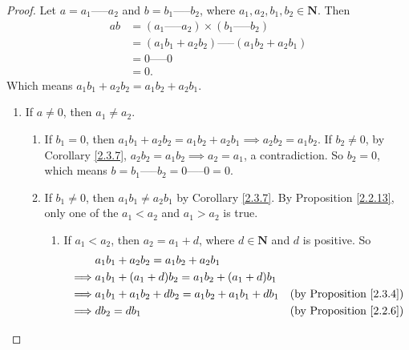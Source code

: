 \begin{proof}
    Let \(a = a_1 \text{-----} a_2\) and \(b = b_1 \text{-----} b_2\), where \(a_1, a_2, b_1, b_2 \in \mathbf{N}\).
    Then
    \begin{align*}
        ab & = (a_1 \text{-----} a_2) \times (b_1 \text{-----} b_2) \\
           & = (a_1b_1 + a_2b_2) \text{-----} (a_1b_2 + a_2b_1)     \\
           & = 0 \text{-----} 0                                     \\
           & = 0.
    \end{align*}
    Which means \(a_1b_1 + a_2b_2 = a_1b_2 + a_2b_1\).
    \begin{enumerate}
        \item If \(a \neq 0\), then \(a_1 \neq a_2\).
              \begin{enumerate}[label=(\roman*)]
                  \item If \(b_1 = 0\), then \(a_1b_1 + a_2b_2 = a_1b_2 + a_2b_1 \implies a_2b_2 = a_1b_2\).
                        If \(b_2 \neq 0\), by Corollary \ref{2.3.7}, \(a_2b_2 = a_1b_2 \implies a_2 = a_1\), a contradiction.
                        So \(b_2 = 0\), which means \(b = b_1 \text{-----} b_2 = 0 \text{-----} 0 = 0\).
                  \item If \(b_1 \neq 0\), then \(a_1b_1 \neq a_2b_1\) by Corollary \ref{2.3.7}.
                        By Proposition \ref{2.2.13}, only one of the \(a_1 < a_2\) and \(a_1 > a_2\) is true.
                        \begin{enumerate}[label=(\arabic*)]
                            \item If \(a_1 < a_2\), then \(a_2 = a_1 + d\), where \(d \in \mathbf{N}\) and \(d\) is positive.
                                  So
                                  \begin{align*}
                                               & a_1b_1 + a_2b_2 = a_1b_2 + a_2b_1                                                     \\
                                      \implies & a_1b_1 + (a_1 + d)b_2 = a_1b_2 + (a_1 + d)b_1                                         \\
                                      \implies & a_1b_1 + a_1b_2 + db_2 = a_1b_2 + a_1b_1 + db_1 & \text{(by Proposition \ref{2.3.4})} \\
                                      \implies & db_2 = db_1                                     & \text{(by Proposition \ref{2.2.6})} \\

\end{align*}
\end{enumerate}
\end{enumerate}
\end{enumerate}
\end{proof}
